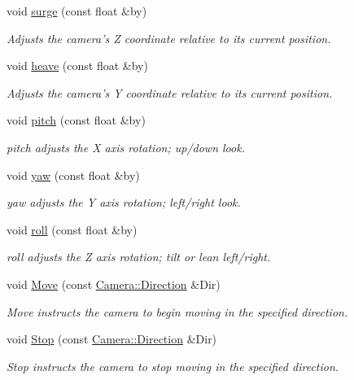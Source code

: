 \begin{DoxyCompactItemize}
void \hyperlink{class_camera_abb2251df65445bf8efd3fe0074fb5033}{surge} (const float \&by)
\begin{DoxyCompactList}\small\item\em \-Adjusts the camera's \-Z coordinate relative to its current position. \end{DoxyCompactList}\item 
void \hyperlink{class_camera_a2148d751f104d8e39c9832e2372df2d9}{heave} (const float \&by)
\begin{DoxyCompactList}\small\item\em \-Adjusts the camera's \-Y coordinate relative to its current position. \end{DoxyCompactList}\item 
void \hyperlink{class_camera_ade9b499340749c916d6ffeeadd7296d4}{pitch} (const float \&by)
\begin{DoxyCompactList}\small\item\em pitch adjusts the \-X axis rotation; up/down look. \end{DoxyCompactList}\item 
void \hyperlink{class_camera_aea440eca8100cae6ffcc6ca915733795}{yaw} (const float \&by)
\begin{DoxyCompactList}\small\item\em yaw adjusts the \-Y axis rotation; left/right look. \end{DoxyCompactList}\item 
void \hyperlink{class_camera_a6a0a10b821c733f380cc82aff09d9498}{roll} (const float \&by)
\begin{DoxyCompactList}\small\item\em roll adjusts the \-Z axis rotation; tilt or lean left/right. \end{DoxyCompactList}\item 
void \hyperlink{class_camera_a421e03f93824e178d6e77ff547cd290e}{\-Move} (const \hyperlink{class_camera_a80cb65605322d27ad3b6d973484509ec}{\-Camera\-::\-Direction} \&\-Dir)
\begin{DoxyCompactList}\small\item\em \-Move instructs the camera to begin moving in the specified direction. \end{DoxyCompactList}\item 
void \hyperlink{class_camera_adf064f765f610684e0675bd67de013fd}{\-Stop} (const \hyperlink{class_camera_a80cb65605322d27ad3b6d973484509ec}{\-Camera\-::\-Direction} \&\-Dir)
\begin{DoxyCompactList}\small\item\em \-Stop instructs the camera to stop moving in the specified direction. \end{DoxyCompactList}\item 

\end{DoxyCompactItemize}

